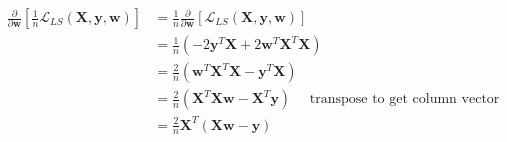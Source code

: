 \newcommand{\matrix}[1]{\mathbf{#1}}
\newcommand{\vector}[1]{\mathbf{#1}}
\newcommand{\X}{\matrix{X}}
\newcommand{\y}{\vector{y}}
\newcommand{\w}{\vector{w}}
\begin{align*}
\frac{\partial}{\partial \w} \left[ \frac{1}{n} \mathcal{L}_{LS}(\X,\y,\w) \right] &= \frac{1}{n} \frac{\partial}{\partial \w} \left[ \mathcal{L}_{LS}(\X,\y,\w) \right] \\
&= \frac{1}{n} \left( -2\y^T\X + 2\w^T\X^T\X \right) \\
&= \frac{2}{n} \left( \w^T\X^T\X - \y^T\X \right) \\
&= \frac{2}{n} \left( \X^T\X\w - \X^T\y \right) \quad \text{ transpose to get column vector} \\
&= \frac{2}{n} \X^T (\X\w - \y) \\
\end{align*}
